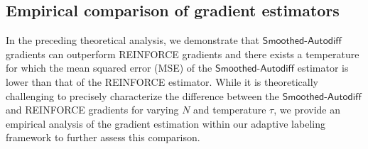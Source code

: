 

\subsection{Empirical comparison of gradient estimators}

\label{sec:empirical_gradient_estimation_quality}

In  the preceding theoretical analysis, we demonstrate  that $\mathsf{Smoothed\text{-}Autodiff}$ gradients can outperform \textsf{REINFORCE} gradients and there exists a temperature for which the mean squared error (MSE) of the $\mathsf{Smoothed\text{-}Autodiff}$ estimator is lower than that of the \textsf{REINFORCE} estimator.  While it is theoretically challenging to precisely characterize the difference between the $\mathsf{Smoothed\text{-}Autodiff}$ and \textsf{REINFORCE} gradients for varying $N$ and temperature $\tau$, we provide an empirical analysis of the gradient estimation within our adaptive labeling framework to further assess this comparison. 



